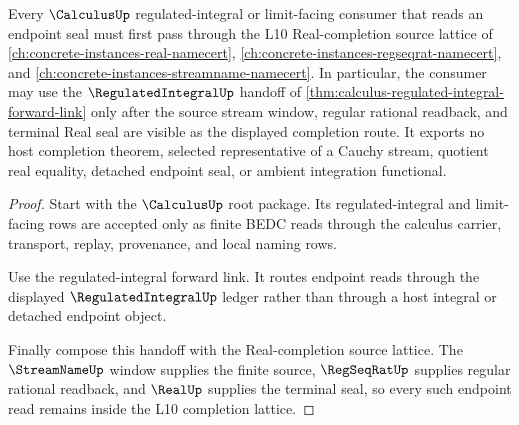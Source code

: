 \begin{theorem}
\label{thm:calculus-real-completion-orphan-lattice-route}
Every $\CalculusUp$ regulated-integral or limit-facing consumer that reads an endpoint seal must first pass through the L10 Real-completion source lattice of \autoref{ch:concrete-instances-real-namecert}, \autoref{ch:concrete-instances-regseqrat-namecert}, and \autoref{ch:concrete-instances-streamname-namecert}. In particular, the consumer may use the $\RegulatedIntegralUp$ handoff of \autoref{thm:calculus-regulated-integral-forward-link} only after the source stream window, regular rational readback, and terminal Real seal are visible as the displayed completion route. It exports no host completion theorem, selected representative of a Cauchy stream, quotient real equality, detached endpoint seal, or ambient integration functional.
\end{theorem}
\begin{proof}
Start with the $\CalculusUp$ root package. Its regulated-integral and limit-facing rows are accepted only as finite BEDC reads through the calculus carrier, transport, replay, provenance, and local naming rows.

Use the regulated-integral forward link. It routes endpoint reads through the displayed $\RegulatedIntegralUp$ ledger rather than through a host integral or detached endpoint object.

Finally compose this handoff with the Real-completion source lattice. The $\StreamNameUp$ window supplies the finite source, $\RegSeqRatUp$ supplies regular rational readback, and $\RealUp$ supplies the terminal seal, so every such endpoint read remains inside the L10 completion lattice.
\end{proof}
